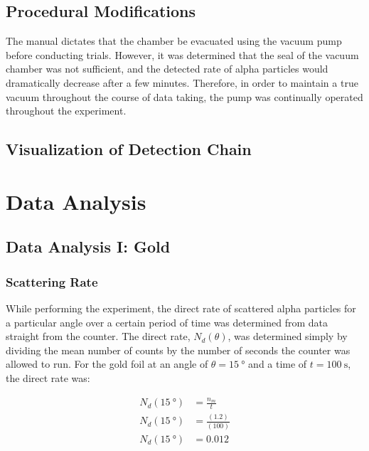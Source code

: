 \documentclass[a4paper]{article}
\begin{document}
\subsection{Procedural Modifications}
\qq The manual dictates that the chamber be evacuated using the vacuum pump
before conducting trials. However, it was determined that the seal of the vacuum
chamber was not sufficient, and the detected rate of alpha particles would
dramatically decrease after a few minutes. Therefore, in order to maintain a
true vacuum throughout the course of data taking, the pump was continually
operated throughout the experiment.  \qq

\subsection{Visualization of Detection Chain}

\section{Data Analysis}

\subsection{Data Analysis I: Gold}

\subsubsection{Scattering Rate}

\qq While performing the experiment, the direct rate of scattered alpha
particles for a particular angle over a certain period of time was determined
from data straight from the counter. The direct rate, \( N_d (\theta) \), was
determined simply by dividing the mean number of counts by the number of seconds
the counter was allowed to run. For the gold foil at an angle of
\( \theta = \SI{15}{\degree} \) and a time of \( t = \SI{100}{\second} \), the
direct rate was:

\begin{align*}
  N_d (\SI{15}{\degree}) &= \frac{n_m}{t} \\
  N_d (\SI{15}{\degree}) &= \frac{(1.2)}{(100)} \\
  N_d (\SI{15}{\degree}) &= \num{0.012} \\
\end{align*}
\end{document}
